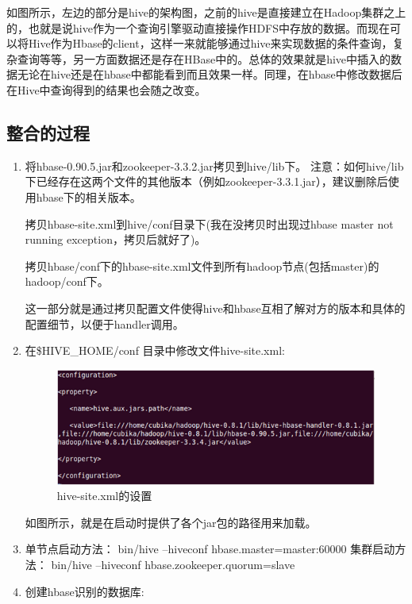   如图所示，左边的部分是hive的架构图，之前的hive是直接建立在Hadoop集群之上的，也就是说hive作为一个查询引擎驱动直接操作HDFS中存放的数据。而现在可以将Hive作为Hbase的client，这样一来就能够通过hive来实现数据的条件查询，复杂查询等等，另一方面数据还是存在HBase中的。总体的效果就是hive中插入的数据无论在hive还是在hbase中都能看到而且效果一样。同理，在hbase中修改数据后在Hive中查询得到的结果也会随之改变。

\subsection{整合的过程}
\begin{enumerate}
\item 将hbase-0.90.5.jar和zookeeper-3.3.2.jar拷贝到hive/lib下。
注意：如何hive/lib下已经存在这两个文件的其他版本（例如zookeeper-3.3.1.jar），建议删除后使用hbase下的相关版本。


拷贝hbase-site.xml到hive/conf目录下(我在没拷贝时出现过hbase master not running exception，拷贝后就好了)。

拷贝hbase/conf下的hbase-site.xml文件到所有hadoop节点(包括master)的hadoop/conf下。

这一部分就是通过拷贝配置文件使得hive和hbase互相了解对方的版本和具体的配置细节，以便于handler调用。

\item 在\$HIVE\_HOME/conf 目录中修改文件hive-site.xml:

\begin{figure}[!ht]
\centering
\includegraphics[]{photo/hive-site.PNG} 
\caption{hive-site.xml的设置}
\end{figure} 

如图所示，就是在启动时提供了各个jar包的路径用来加载。

\item 单节点启动方法：
bin/hive –hiveconf hbase.master=master:60000
集群启动方法：
bin/hive –hiveconf hbase.zookeeper.quorum=slave


\item  创建hbase识别的数据库:


\end{enumerate}
